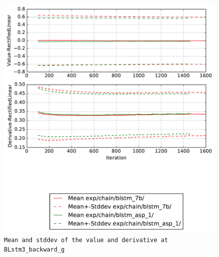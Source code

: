 \documentclass[prl,10pt,twocolumn]{revtex4}
\begin{document}
\newpage
\begin{figure}[h]
  \begin{center}
    \caption{\texttt{Mean and stddev of the value and derivative at BLstm3\_backward\_g}}
    \includegraphics[width=\textwidth]{exp/chain/blstm_7b/report/nonlinstats_BLstm3_backward_g.pdf}
  \end{center}
\end{figure}
\clearpage
\end{document}
